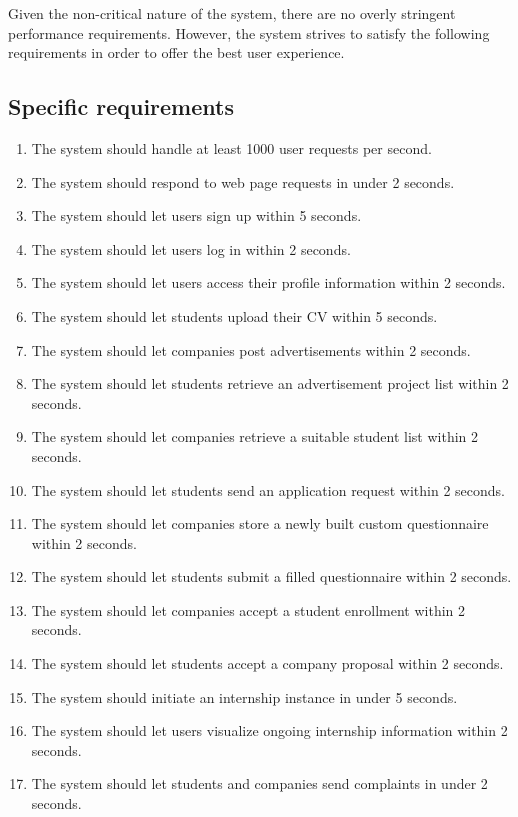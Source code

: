 Given the non-critical nature of the system, there are no overly stringent performance requirements.
However, the system strives to satisfy the following requirements in order to offer the best user experience.

\subsection{Specific requirements}

\begin{enumerate}[label=\textbf{SR\arabic* -}]
    \item The system should handle at least 1000 user requests per second.
    \item The system should respond to web page requests in under 2 seconds.
    \item The system should let users sign up within 5 seconds.
    \item The system should let users log in within 2 seconds.
    \item The system should let users access their profile information within 2 seconds.
    \item The system should let students upload their CV within 5 seconds.
    \item The system should let companies post advertisements within 2 seconds.
    \item The system should let students retrieve an advertisement project list within 2 seconds.
    \item The system should let companies retrieve a suitable student list within 2 seconds.
    \item The system should let students send an application request within 2 seconds.
    \item The system should let companies store a newly built custom questionnaire within 2 seconds.
    \item The system should let students submit a filled questionnaire within 2 seconds.
    \item The system should let companies accept a student enrollment within 2 seconds.
    \item The system should let students accept a company proposal within 2 seconds.
    \item The system should initiate an internship instance in under 5 seconds.
    \item The system should let users visualize ongoing internship information within 2 seconds.
    \item The system should let students and companies send complaints in under 2 seconds.

\end{enumerate}
